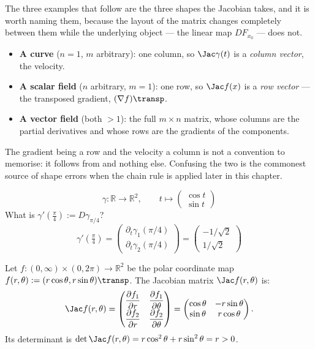 The three examples that follow are the three shapes the Jacobian takes, and it is worth naming
them, because the layout of the matrix changes completely between them while the underlying
object --- the linear map $DF_{x_0}$ --- does not.
\begin{itemize}
  \item \textbf{A curve} ($n=1$, $m$ arbitrary): one column, so $\Jac\gamma(t)$ is a
    \emph{column vector}, the velocity.
  \item \textbf{A scalar field} ($n$ arbitrary, $m=1$): one row, so $\Jac f(x)$ is a
    \emph{row vector} --- the transposed gradient, $(\nabla f)\transp$.
  \item \textbf{A vector field} (both $>1$): the full $m \times n$ matrix, whose columns are the
    partial derivatives and whose rows are the gradients of the components.
\end{itemize}
The gradient being a row and the velocity a column is not a convention to memorise: it follows
from  and nothing else. Confusing the two is the commonest source of
shape errors when the chain rule is applied later in this chapter.

\begin{example}
\[\gamma : \mathbb{R}\to\mathbb{R}^2, \qquad t \mapsto \begin{pmatrix}\cos t \\ \sin t\end{pmatrix}\]
What is $\gamma'(\tfrac{\pi}{4}) := D\gamma_{\pi/4}$?
\[\gamma'\!\left(\tfrac{\pi}{4}\right) = \begin{pmatrix}\partial_t\gamma_1(\pi/4) \\ \partial_t\gamma_2(\pi/4)\end{pmatrix} = \begin{pmatrix}-1/\sqrt{2} \\ 1/\sqrt{2}\end{pmatrix}\]
\end{example}

\begin{aiexample}
Let $f \colon (0,\infty) \times (0,2\pi) \to \mathbb{R}^2$ be the polar coordinate map $f(r,\theta) := (r\cos\theta, r\sin\theta)\transp$. The Jacobian matrix $\Jac f(r,\theta)$ is:
\[
\Jac f(r,\theta) = \begin{pmatrix} \dfrac{\partial f_1}{\partial r} & \dfrac{\partial f_1}{\partial \theta} \\[1ex] \dfrac{\partial f_2}{\partial r} & \dfrac{\partial f_2}{\partial \theta} \end{pmatrix} = \begin{pmatrix} \cos\theta & -r\sin\theta \\ \sin\theta & r\cos\theta \end{pmatrix}.
\]
Its determinant is $\det \Jac f(r,\theta) = r\cos^2\theta + r\sin^2\theta = r > 0$.
\end{aiexample}

